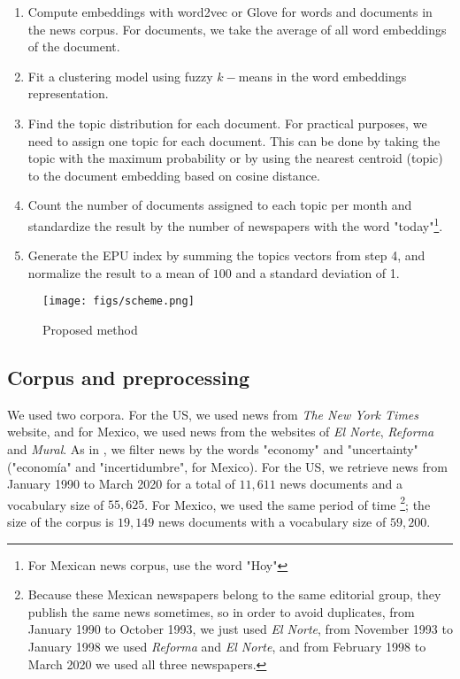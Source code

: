 \documentclass{article}
\begin{document}
\begin{enumerate}
\item Compute embeddings with word2vec or Glove for words and documents in the news corpus. For documents, we take the average of all word embeddings of the document. 
\item Fit a clustering model using fuzzy $k-$means in the word embeddings representation.
\item Find the topic distribution for each document. For practical purposes, we need to assign one topic for each document. This can be done by taking the topic with the maximum probability or by using the nearest centroid (topic) to the document embedding based on cosine distance.
\item Count the number of documents assigned to each topic per month and standardize the result by the number of newspapers with the word "today"\footnote{For Mexican news corpus,  use the word "Hoy"}.
\item Generate the EPU index by summing the topics vectors from step 4, and normalize the result to a mean of $ 100 $ and a standard deviation of 1.
\end{enumerate}

\begin{figure}[H]
  \centering
  \texttt{[image: figs/scheme.png]}
   \caption{Proposed method}
    \label{fig:HeuristicMethod}
\end{figure}

\subsection{Corpus and preprocessing}

We used two corpora. For the US, we used news from \emph{The New York Times} website, and for Mexico, we used news from the websites of \emph{El Norte}, \emph{Reforma} and \emph{Mural}. As in \cite{Azqueta2017}, we filter news by the words "economy" and "uncertainty" ("economía" and "incertidumbre", for Mexico). For the US, we retrieve news from January 1990 to March 2020 for a total of $11,611$ news documents and a vocabulary size of $55,625$. For Mexico, we used the same period of time \footnote{Because these Mexican newspapers belong to the same editorial group, they publish the same news sometimes, so in order to avoid duplicates, from January 1990 to October 1993, we just used \emph{El Norte}, from November 1993 to January 1998 we used \emph{Reforma} and \emph{El Norte}, and from February 1998 to March 2020 we used all three newspapers.}; the size of the corpus is $19,149$ news documents with a vocabulary size of $59,200$. 
\end{document}
